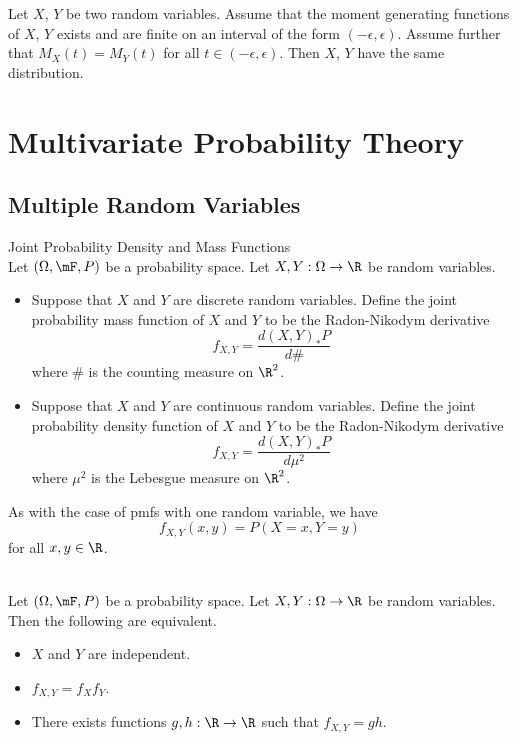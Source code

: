 \documentclass[a4paper]{article}
\begin{document}
\begin{prp}{}{} Let $X$, $Y$ be two random variables. Assume that the moment generating functions of $X$, $Y$ exists and are finite on an interval of the form $(-\epsilon,\epsilon)$. Assume further that $M_X(t)=M_Y(t)$ for all $t\in(-\epsilon,\epsilon)$. Then $X$, $Y$ have the same distribution. 
\end{prp}

\pagebreak
\section{Multivariate Probability Theory}
\subsection{Multiple Random Variables}
\begin{defn}{Joint Probability Density and Mass Functions}{}\\
Let $(\Omega,\mF,P)$ be a probability space. Let $X,Y:\Omega\to\R$ be random variables. 
\begin{itemize}
\item Suppose that $X$ and $Y$ are discrete random variables. Define the joint probability mass function of $X$ and $Y$ to be the Radon-Nikodym derivative $$f_{X,Y}=\frac{d(X,Y)_\ast P}{d\#}$$ where $\#$ is the counting measure on $\R^2$. 
\item Suppose that $X$ and $Y$ are continuous random variables. Define the joint probability density function of $X$ and $Y$ to be the Radon-Nikodym derivative $$f_{X,Y}=\frac{d(X,Y)_\ast P}{d\mu^2}$$ where $\mu^2$ is the Lebesgue measure on $\R^2$. 
\end{itemize}
\end{defn}

As with the case of pmfs with one random variable, we have $$f_{X,Y}(x,y)=P(X=x,Y=y)$$ for all $x,y\in\R$. 

\begin{lmm}{}{}\\
Let $(\Omega,\mF,P)$ be a probability space. Let $X,Y:\Omega\to\R$ be random variables. Then the following are equivalent. 
\begin{itemize}
\item $X$ and $Y$ are independent. 
\item $f_{X,Y}=f_Xf_Y$. 
\item There exists functions $g,h:\R\to\R$ such that $f_{X,Y}=gh$. 
\end{itemize}
\end{lmm}
\end{document}
